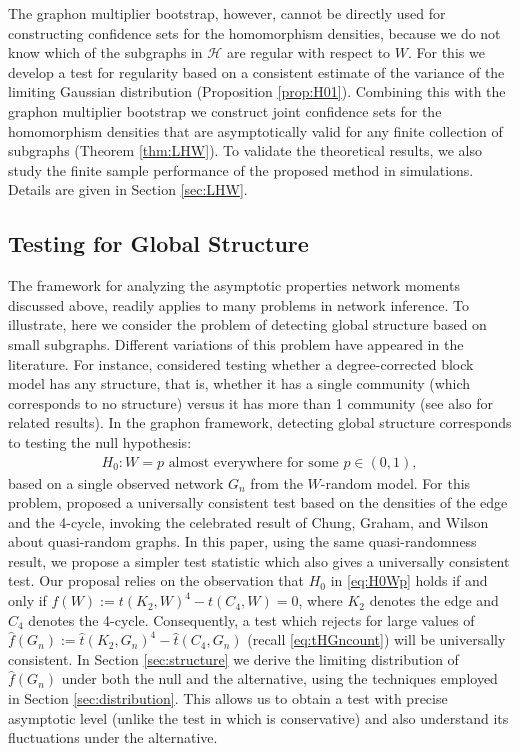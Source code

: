 \documentclass[11pt,reqno]{amsart}
\numberwithin{equation}{section}
\newcommand{\cH}{{\mathcal H}}
\theoremstyle{definition}
\begin{document}
The graphon multiplier bootstrap, however, cannot be directly used for constructing confidence sets for the homomorphism densities, because we do not know which of the subgraphs in $\cH$ are regular with respect to $W$. For this we develop a test for regularity based on a consistent estimate of the variance of the limiting Gaussian distribution (Proposition \ref{prop:H01}). Combining this with the graphon multiplier bootstrap we construct joint confidence sets for the homomorphism densities that are asymptotically valid for any finite collection of subgraphs (Theorem \ref{thm:LHW}). 
To validate the theoretical results, we also study the finite sample performance of the proposed method in simulations. Details are given in Section \ref{sec:LHW}. 





\subsection{Testing for Global Structure} 


The framework for analyzing the asymptotic properties network moments discussed above, readily applies to many problems in network inference.  To illustrate, here we consider the problem of detecting global structure based on small subgraphs.  
Different variations of this problem have appeared in the literature. For instance, \citet{gao2017testing} considered testing whether a degree-corrected block model has any structure, that is, whether it has a single community (which corresponds to no structure) versus it has more than 1 community (see  also \cite{gao2017subgraph} for related results). In the graphon framework, detecting global structure corresponds to testing the null hypothesis: 
\begin{align}\label{eq:H0Wp}
    H_0: W = p \text{ almost everywhere for some } p \in (0, 1) , 
\end{align}
based on a single observed network $G_n$ from the $W$-random model. For this problem, \citet{fangandrollin2015} proposed a universally consistent test based on the densities of the edge and the 4-cycle, invoking the celebrated result of Chung, Graham, and Wilson \cite{chung1989cycle} about quasi-random graphs.  In this paper, using the same quasi-randomness result, we propose a simpler test statistic which also gives a universally consistent test. Our proposal relies on the observation that $H_0$ in \eqref{eq:H0Wp} holds if and only if $f(W):=t(K_{2},W)^{4} - t(C_{4},W) =0$, where $K_2$ denotes the edge and $C_4$ denotes the 4-cycle. Consequently, a test which rejects for large values of $\hat f(G_n) := \hat t(K_{2},G_n)^{4} - \hat t(C_{4}, G_n)$ (recall \eqref{eq:tHGncount}) will be universally consistent. In Section \ref{sec:structure} we derive the limiting distribution of $\hat f(G_n)$ under both the null and the alternative, using the techniques employed in Section \ref{sec:distribution}. This allows us to obtain a test with precise asymptotic level (unlike the test in \cite{fangandrollin2015} which is conservative) and also understand its fluctuations under the alternative. 
\end{document}
